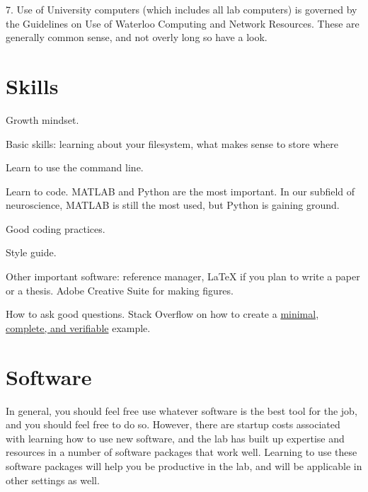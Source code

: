 \documentclass{tufte-book}
\begin{document}
7. Use of University computers (which includes all lab computers) is
governed by the Guidelines on Use of Waterloo Computing and Network
Resources. These are generally common sense, and not overly long so
have a look.

\section{Skills}

Growth mindset.

Basic skills: learning about your filesystem, what makes sense to
store where

Learn to use the command line.

Learn to code. MATLAB and Python are the most important. In our
subfield of neuroscience, MATLAB is still the most used, but Python is
gaining ground.

Good coding practices.

Style guide.

Other important software: reference manager, LaTeX if you plan to
write a paper or a thesis. Adobe Creative Suite for making figures.

How to ask good questions. Stack Overflow on how to create a
\href{https://stackoverflow.com/help/mcve}{minimal, complete, and
  verifiable} example.

\section{Software}

In general, you should feel free use whatever software is the best
tool for the job, and you should feel free to do so. However, there are
startup costs associated with learning how to use new software, and
the lab has built up expertise and resources in a number of software
packages that work well. Learning to use these software packages will
help you be productive in the lab, and will be applicable in other
settings as well.
\end{document}
